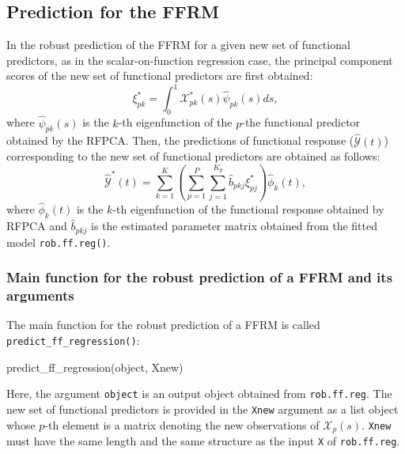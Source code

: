 \subsection*{Prediction for the FFRM}

In the robust prediction of the FFRM for a given new set of functional predictors, as in the scalar-on-function regression case, the principal component scores of the new set of functional predictors are first obtained:
\begin{equation*}
\xi_{pk}^* = \int_0^1 \mathcal{X}^*_{pk}(s) \widehat{\psi}_{pk}(s) ds,
\end{equation*}
where $\widehat{\psi}_{pk}(s)$ is the $k$-th eigenfunction of the $p$-the functional predictor obtained by the RFPCA. Then, the predictions of functional response ($\widehat{\mathcal{Y}}(t)$) corresponding to the new set of functional predictors are obtained as follows:
\begin{equation*}
\widehat{\mathcal{Y}}^*(t) = \sum_{k=1}^K \left(\sum_{p=1}^P \sum_{j=1}^{K_p} \widehat{b}_{pkj} \xi_{pj}^* \right) \widehat{\phi}_k(t),
\end{equation*}
where $\widehat{\phi}_k(t)$ is the $k$-th eigenfunction of the functional response obtained by RFPCA and $\widehat{b}_{pkj}$ is the estimated parameter matrix obtained from the fitted model \texttt{rob.ff.reg()}.

\subsubsection*{Main function for the robust prediction of a FFRM and its arguments}

The main function for the robust prediction of a FFRM is called \texttt{predict\_ff\_regression()}:
\begin{smallexample}
\begin{smallverbatim}
predict_ff_regression(object, Xnew)
\end{smallverbatim}
\end{smallexample}
Here, the argument \texttt{object} is an output object obtained from \texttt{rob.ff.reg}. The new set of functional predictors is provided in the \texttt{Xnew} argument as a list object whose $p$-th element is a matrix denoting the new observations of $\mathcal{X}_p(s)$. \texttt{Xnew} must have the same length and the same structure as the input \texttt{X} of \texttt{rob.ff.reg}.

